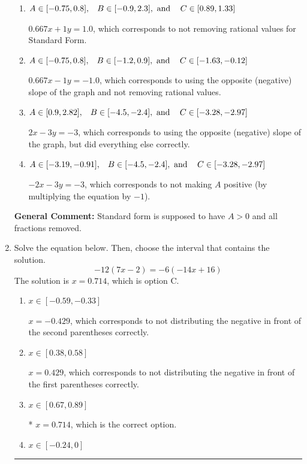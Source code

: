 \documentclass{extbook}[14pt]
\newcommand{\litem}[1]{\item #1

\rule{\textwidth}{0.4pt}}
\begin{document}
\begin{enumerate}
{\begin{enumerate}[label=\Alph*.]
* $2x + 3y = 3$, which is the correct option.
\item \( A \in [-0.75, 0.8], \hspace{3mm} B \in [-0.9, 2.3], \text{ and } \hspace{3mm} C \in [0.89, 1.33] \)

 $0.667x + 1y = 1.0$, which corresponds to not removing rational values for Standard Form.
\item \( A \in [-0.75, 0.8], \hspace{3mm} B \in [-1.2, 0.9], \text{ and } \hspace{3mm} C \in [-1.63, -0.12] \)

 $0.667x - 1y = -1.0$, which corresponds to using the opposite (negative) slope of the graph and not removing rational values.
\item \( A \in [0.9, 2.82], \hspace{3mm} B \in [-4.5, -2.4], \text{ and } \hspace{3mm} C \in [-3.28, -2.97] \)

 $2x - 3y = -3$, which corresponds to using the opposite (negative) slope of the graph, but did everything else correctly.
\item \( A \in [-3.19, -0.91], \hspace{3mm} B \in [-4.5, -2.4], \text{ and } \hspace{3mm} C \in [-3.28, -2.97] \)

 $-2x - 3y = -3$, which corresponds to not making $A$ positive (by multiplying the equation by $-1$).
\end{enumerate}

\textbf{General Comment:} Standard form is supposed to have $A > 0$ and all fractions removed.
}
\litem{
Solve the equation below. Then, choose the interval that contains the solution.
\[ -12(7x -2) = -6(-14x + 16) \]The solution is \( x = 0.714 \), which is option C.\begin{enumerate}[label=\Alph*.]
\item \( x \in [-0.59, -0.33] \)

$x = -0.429$, which corresponds to not distributing the negative in front of the second parentheses correctly.
\item \( x \in [0.38, 0.58] \)

$x = 0.429$, which corresponds to not distributing the negative in front of the first parentheses correctly.
\item \( x \in [0.67, 0.89] \)

* $x = 0.714$, which is the correct option.
\item \( x \in [-0.24, 0] \)


\end{enumerate}}
\end{enumerate}
\end{document}
